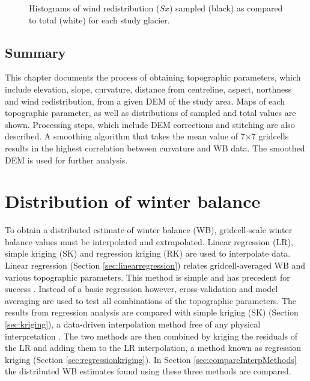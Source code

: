 \documentclass{sfuthesis}
\begin{document}
\begin{figure}[H]
	\caption[Histograms of full and sampled wind redistribution ($Sx$)]{Histograms of wind redistribution ($Sx$) sampled (black) as compared to total (white) for each study glacier.}
	\label{sampledRange:Sx}
\end{figure}


\section{Summary}

This chapter documents the process of obtaining topographic parameters, which include elevation, slope, curvature, distance from centreline, aspect, northness and wind redistribution, from a given DEM of the study area. Maps of each topographic parameter, as well as distributions of sampled and total values are shown. Processing steps, which include DEM corrections and stitching are also described. A smoothing algorithm that takes the mean value of 7$\times$7 gridcells results in the highest correlation between curvature and WB data. The smoothed DEM is used for further analysis. 



\chapter{Distribution of winter balance}

To obtain a distributed estimate of winter balance (WB), gridcell-scale winter balance values must be interpolated and extrapolated. Linear regression (LR), simple kriging (SK) and regression kriging (RK) are used to interpolate data. Linear regression (Section \ref{sec:linearregression}) relates gridcell-averaged WB and various topographic parameters. This method is simple and has precedent for success \citep[e.g.][]{McGrath2015}. Instead of a basic regression however, cross-validation and model averaging are used to test all combinations of the topographic parameters. The results from regression analysis are compared with simple kriging (SK) (Section \ref{sec:kriging}), a data-driven interpolation method free of any physical interpretation \citep[e.g.][]{Hock1999}. The two methods are then combined by kriging the residuals of the LR and adding them to the LR interpolation, a method known as regression kriging (Section \ref{sec:regressionkriging}). In Section \ref{sec:compareInterpMethods} the distributed WB estimates found using these three methods are compared.
\end{document}
